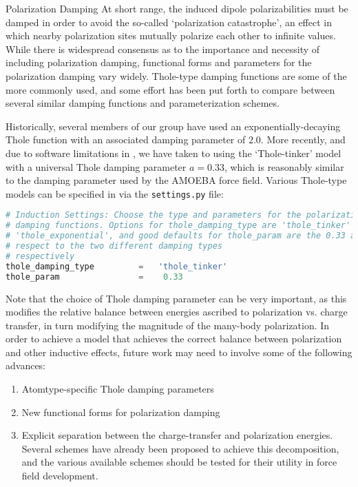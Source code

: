 \begin{paragraph}{Polarization Damping}
At short range, the induced dipole polarizabilities must be damped in order to
avoid the so-called `polarization catastrophe', an effect in which nearby
polarization sites mutually polarize each other to 
infinite values. While there is widespread consensus as to the importance and
necessity of including polarization damping, functional forms and parameters
for the polarization damping vary widely.\cite{Cieplak2009,Lopes2009,Thole1981,Slipchenko2009,Wang2011}
Thole-type damping functions\footnotemark{} are some of the more commonly used, and some
effort has been put forth to compare between several similar damping functions
and parameterization schemes.\cite{Wang2011,Wang2012,Liu2017}

Historically,\cite{McDaniel2013} several members of our group have used an
exponentially-decaying Thole function with an associated damping parameter of
2.0.\cite{Yu2011} More recently, and due to software limitations in \openmm,
we have taken to using the `Thole-tinker' model with a universal Thole damping
parameter $a=0.33$, which is reasonably similar to the damping parameter used by the
AMOEBA force field.\cite{VanVleet2017} Various Thole-type models can be
specified in \pointer
via the \verb|settings.py| file:
\begin{lstlisting}[language=python]
# Induction Settings: Choose the type and parameters for the polarization
# damping functions. Options for thole_damping_type are 'thole_tinker' and
# 'thole_exponential', and good defaults for thole_param are the 0.33 and 2.0 with
# respect to the two different damping types
# respectively
thole_damping_type         =   'thole_tinker'
thole_param                =    0.33
\end{lstlisting}
%
Note that the choice of Thole damping parameter can be very important, as this
modifies the relative balance between energies ascribed to polarization vs.
charge transfer, in turn modifying the magnitude of the many-body
polarization. In order to achieve a model that achieves the correct balance
between polarization and other inductive effects, future work may need to
involve some of the following advances:
\begin{enumerate}
\item Atomtype-specific Thole damping parameters
\item New functional forms for polarization damping
\item Explicit separation between the \sapt charge-transfer and polarization
energies. Several schemes have already been proposed to achieve this decomposition,
\cite{Bistoni2016,Misquitta2013,Horn2016b,Lao2016}
and the various available schemes should be tested for their utility in force field
development.
\end{enumerate}
\end{paragraph}

